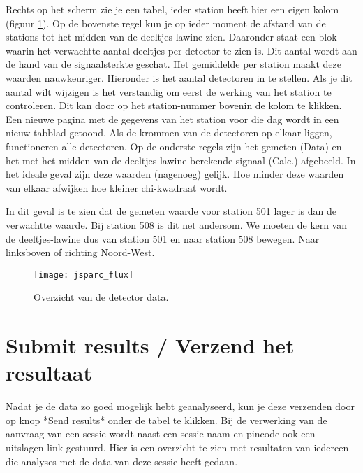 Rechts op het scherm zie je een tabel, ieder station heeft hier een eigen kolom
(figuur \ref{fig:detectordata}).
Op de bovenste regel kun je op ieder moment de afstand van de stations tot
het midden van de deeltjes-lawine zien. Daaronder staat een blok waarin het
verwachtte aantal deeltjes per detector te zien is. Dit aantal wordt aan de
hand van de signaalsterkte geschat. Het gemiddelde per station maakt deze
waarden nauwkeuriger. Hieronder is het aantal detectoren in te stellen. Als je
dit aantal wilt wijzigen is het verstandig om eerst de werking van het station
te controleren. Dit kan door op het station-nummer bovenin de kolom te klikken.
Een nieuwe pagina met de gegevens van het station voor die dag wordt in een
nieuw tabblad getoond. Als de krommen van de detectoren op elkaar liggen,
functioneren alle detectoren.
Op de onderste regels zijn het gemeten (Data) en het met het midden van de
deeltjes-lawine berekende signaal (Calc.) afgebeeld. In het ideale geval zijn
deze waarden (nagenoeg) gelijk.
Hoe minder deze waarden van elkaar afwijken hoe kleiner chi-kwadraat wordt.

In dit geval is te zien dat de gemeten waarde voor station 501 lager is dan de verwachtte waarde. Bij station 508 is dit net andersom. We moeten de kern van de deeltjes-lawine dus van station 501 en naar station 508 bewegen. Naar linksboven of richting Noord-West.

\begin{figure}[ht]
    \centering
    \texttt{[image: jsparc\_flux]}
    \caption{Overzicht  van de detector data. }
    \label{fig:detectordata}
\end{figure}

\section{Submit results / Verzend het resultaat}

Nadat je de data zo goed mogelijk hebt geanalyseerd, kun je deze verzenden
door op knop *Send results* onder de tabel te klikken. Bij de verwerking van
de aanvraag van een sessie wordt naast een sessie-naam en pincode ook een
uitslagen-link gestuurd. Hier is een overzicht te zien met resultaten van
iedereen die analyses met de data van deze sessie heeft gedaan.


